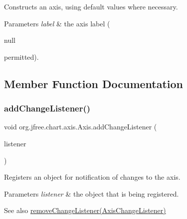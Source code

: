 Constructs an axis, using default values where necessary.


\begin{DoxyParams}{Parameters}
{\em label} & the axis label (
\begin{DoxyCode}
null 
\end{DoxyCode}
 permitted). \\
\hline
\end{DoxyParams}


\subsection{Member Function Documentation}
\mbox{\label{classorg_1_1jfree_1_1chart_1_1axis_1_1_axis_a5529aef8c91a529add5a138bb2d0552a}} 
\subsubsection{\texorpdfstring{add\+Change\+Listener()}{addChangeListener()}}
{\footnotesize\ttfamily void org.\+jfree.\+chart.\+axis.\+Axis.\+add\+Change\+Listener (\begin{DoxyParamCaption}\item[{\mbox{\hyperlink{interfaceorg_1_1jfree_1_1chart_1_1event_1_1_axis_change_listener}{Axis\+Change\+Listener}}}]{listener }\end{DoxyParamCaption})}

Registers an object for notification of changes to the axis.


\begin{DoxyParams}{Parameters}
{\em listener} & the object that is being registered.\\
\hline
\end{DoxyParams}
\begin{DoxySeeAlso}{See also}
\mbox{\hyperlink{classorg_1_1jfree_1_1chart_1_1axis_1_1_axis_a4391388f91765cec42466ad85e4969a4}{remove\+Change\+Listener(\+Axis\+Change\+Listener)}} 
\end{DoxySeeAlso}
\mbox{\label{classorg_1_1jfree_1_1chart_1_1axis_1_1_axis_af26aa9ca8d592fb08c529b0f0734d210}} 
